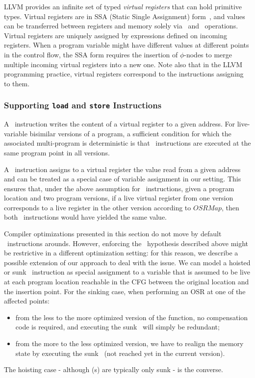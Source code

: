 LLVM provides an infinite set of typed {\em virtual registers} that can hold primitive types. Virtual registers are in SSA (Static Single Assignment) form~\cite{Cytron91}, and values can be transferred between registers and memory solely via \load\ and \store\ operations. Virtual registers are uniquely assigned by expressions defined on incoming registers. When a program variable might have different values at different points in the control flow, the SSA form requires the insertion of $\phi$-nodes to merge multiple incoming virtual registers into a new one. Note also that in the LLVM programming practice, virtual registers correspond to the instructions assigning to them.

\subsubsection*{Supporting \texttt{load} and \texttt{store} Instructions}
A \store\ instruction writes the content of a virtual register to a given address. For live-variable bisimilar versions of a program, a sufficient condition for which the associated multi-program is deterministic is that \store\ instructions are executed at the same program point in all versions.

A \load\ instruction assigns to a virtual register the value read from a given address and can be treated as a special case of variable assignment in our setting. This ensures that, under the above assumption for \store\ instructions, given a program location and two program versions, if a live virtual register from one version corresponds to a live register in the other version according to $OSRMap$, then both \load\ instructions would have yielded the same value.

Compiler optimizations presented in this section do not move by default \store\ instructions arounds. However, enforcing the \store\ hypothesis described above might be restrictive in a different optimization setting: for this reason, we describe a possible extension of our approach to deal with the issue. We can model a hoisted or sunk \store\ instruction as special assignment to a variable that is assumed to be live at each program location reachable in the CFG between the original location and the insertion point. For the sinking case, when performing an OSR at one of the affected points:
\begin{itemize}[itemsep=0pt,parsep=3pt,partopsep=0pt]
 \item from the less to the more optimized version of the function, no compensation code is required, and executing the sunk \store\ will simply be redundant;
 \item from the more to the less optimized version, we have to realign the memory state by executing the sunk \store\ (not reached yet in the current version).
\end{itemize}
The hoisting case - although \store(s) are typically only sunk - is the converse.

